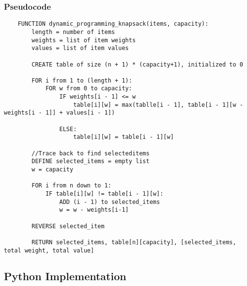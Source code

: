 \documentclass{article}
\begin{document}
\subsubsection*{Pseudocode}
\begin{lstlisting}
    FUNCTION dynamic_programming_knapsack(items, capacity):
        length = number of items
        weights = list of item weights
        values = list of item values

        CREATE table of size (n + 1) * (capacity+1), initialized to 0

        FOR i from 1 to (length + 1):
            FOR w from 0 to capacity:
                IF weights[i - 1] <= w
                    table[i][w] = max(tablle[i - 1], table[i - 1][w - weights[i - 1]] + values[i - 1])
                
                ELSE:
                    table[i][w] = table[i - 1][w]

        //Trace back to find selecteditems
        DEFINE selected_items = empty list
        w = capacity

        FOR i from n down to 1:
            IF table[i][w] != table[i - 1][w]:
                ADD (i - 1) to selected_items
                w = w - weights[i-1]

        REVERSE selected_item

        RETURN selected_items, table[n][capacity], [selected_items, total weight, total value]

\end{lstlisting}

\subsection*{Python Implementation}
\end{document}
